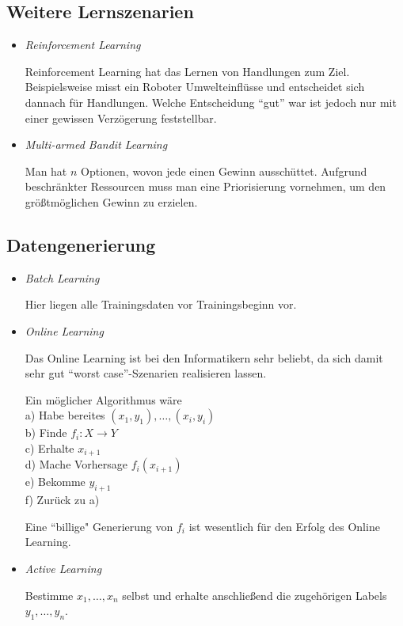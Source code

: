 \subsection{Weitere Lernszenarien}

\begin{itemize}
  \item\textit{Reinforcement Learning}

 Reinforcement Learning hat das Lernen von Handlungen zum Ziel. Beispielsweise
 misst ein Roboter Umwelteinflüsse und entscheidet sich dannach für
 Handlungen. Welche Entscheidung ``gut'' war ist jedoch nur mit einer gewissen
 Verzögerung feststellbar.
 
 
 \item\textit{Multi-armed Bandit Learning}
 
 Man hat $n$ Optionen, wovon jede einen Gewinn ausschüttet. Aufgrund
 beschränkter Ressourcen muss man eine Priorisierung vornehmen, um den
 größtmöglichen Gewinn zu erzielen.
 \end{itemize}

 \subsection{Datengenerierung}
 
\begin{itemize}
\item\textit{Batch Learning}
 
 Hier liegen alle Trainingsdaten vor Trainingsbeginn vor.
 
 \item\textit{Online Learning}
 
Das Online Learning ist bei den Informatikern sehr beliebt, da sich damit sehr
gut ``worst case''-Szenarien realisieren lassen.

\noindent
Ein möglicher Algorithmus wäre\\
a) Habe bereites $(x_1,y_1),\ldots,(x_i,y_i)$\\
b) Finde $f_i : X\to Y$\\
c) Erhalte $x_{i+1}$\\
d) Mache Vorhersage $f_i(x_{i+1})$\\
e) Bekomme $y_{i+1}$\\
f) Zurück zu a)

Eine ``billige" Generierung von $f_i$ ist wesentlich für den Erfolg des Online
Learning.
\item\textit{Active Learning}

Bestimme $x_1,\ldots,x_n$ selbst und erhalte anschließend die zugehörigen
Labels $y_1,\ldots,y_n$.
\end{itemize}


